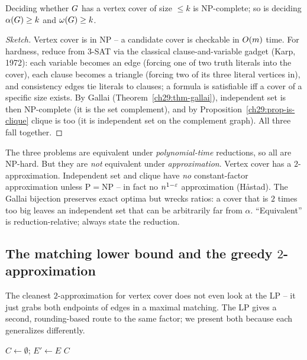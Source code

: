\begin{theorem}[NP-completeness]
\label{ch29:thm-nphard}
Deciding whether $G$ has a vertex cover of size $\le k$ is NP-complete; so is
deciding $\alpha(G)\ge k$ and $\omega(G)\ge k$.
\end{theorem}

\begin{proof}[Sketch]
Vertex cover is in NP -- a candidate cover is checkable in $O(m)$ time. For
hardness, reduce from $3$-SAT via the classical clause-and-variable gadget
(Karp, 1972): each variable becomes an edge (forcing one of two truth literals
into the cover), each clause becomes a triangle (forcing two of its three literal
vertices in), and consistency edges tie literals to clauses; a formula is
satisfiable iff a cover of a specific size exists. By Gallai
(Theorem~\ref{ch29:thm-gallai}), independent set is then NP-complete (it is the
set complement), and by Proposition~\ref{ch29:prop-is-clique} clique is too (it
is independent set on the complement graph). All three fall together.
\end{proof}

\begin{trapbox}
The three problems are equivalent under \emph{polynomial-time} reductions, so all
are NP-hard. But they are \emph{not} equivalent under \emph{approximation}.
Vertex cover has a $2$-approximation. Independent set and clique have
\emph{no} constant-factor approximation unless P${}={}$NP -- in fact no
$n^{1-\varepsilon}$ approximation (H{\aa}stad). The Gallai bijection preserves exact
optima but wrecks ratios: a cover that is $2$ times too big leaves an independent
set that can be arbitrarily far from $\alpha$. ``Equivalent'' is
reduction-relative; always state the reduction.
\end{trapbox}

\subsection{The matching lower bound and the greedy $2$-approximation}

The cleanest $2$-approximation for vertex cover does not even look at the LP -- it
just grabs both endpoints of edges in a maximal matching. The LP gives a second,
rounding-based route to the same factor; we present both because each generalizes
differently.

\begin{algorithm}[H]
\caption{\textsc{MatchingVC}$(\Gph)$ -- $2$-approximate vertex cover}
\label{ch29:alg-matchvc}
\DontPrintSemicolon
$C\leftarrow\emptyset$; $E'\leftarrow E$\;
\Return $C$\;
\end{algorithm}

